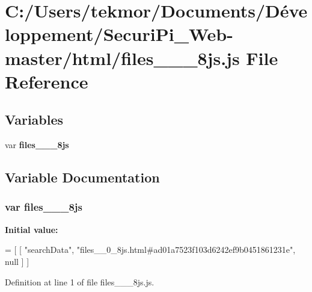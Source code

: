 \section{C\+:/\+Users/tekmor/\+Documents/\+Développement/\+Securi\+Pi\+\_\+\+Web-\/master/html/files\+\_\+\+\_\+\_\+8js.js File Reference}
\label{files____0__8js_8js}
\subsection*{Variables}
\begin{DoxyCompactItemize}
\item 
var {\bf files\+\_\+\+\_\+\_\+8js}
\end{DoxyCompactItemize}


\subsection{Variable Documentation}
\subsubsection[{files\+\_\+\+\_\+0\+\_\+8js}]{\setlength{\rightskip}{0pt plus 5cm}var files\+\_\+\+\_\+\_\+8js}\label{files____0__8js_8js_ae10be6493e1df354f4870e8b6fc6f78b}
{\bfseries Initial value\+:}
\begin{DoxyCode}
=
[
    [ \textcolor{stringliteral}{"searchData"}, \textcolor{stringliteral}{"files\_\_0\_8js.html#ad01a7523f103d6242ef9b0451861231e"}, null ]
]
\end{DoxyCode}


Definition at line 1 of file files\+\_\+\+\_\+\_\+8js.\+js.

